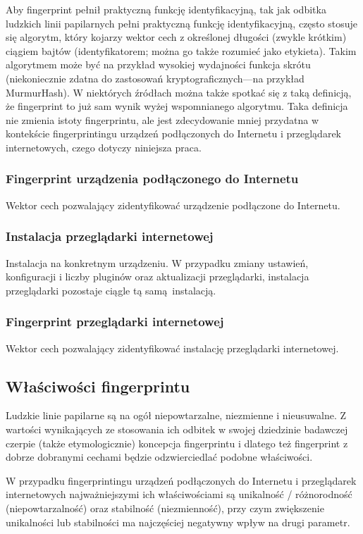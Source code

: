 Aby fingerprint pełnił praktyczną funkcję identyfikacyjną, tak jak odbitka
ludzkich linii papilarnych pełni praktyczną funkcję identyfikacyjną, często
stosuje się algorytm, który kojarzy wektor cech z określonej długości (zwykle
krótkim) ciągiem bajtów (identyfikatorem; można go także rozumieć jako
etykieta). Takim algorytmem może być na przykład wysokiej wydajności funkcja
skrótu (niekoniecznie zdatna do zastosowań kryptograficznych---na przykład
MurmurHash). W niektórych źródłach można także spotkać się z taką definicją, że
fingerprint to już sam wynik wyżej wspomnianego algorytmu. Taka definicja nie
zmienia istoty fingerprintu, ale jest zdecydowanie mniej przydatna w kontekście
fingerprintingu urządzeń podłączonych do Internetu i przeglądarek internetowych,
czego dotyczy niniejsza praca.

\subsubsection{Fingerprint urządzenia podłączonego do Internetu}
Wektor cech pozwalający zidentyfikować urządzenie podłączone do Internetu.

\subsubsection{Instalacja przeglądarki internetowej}
Instalacja na konkretnym urządzeniu. W przypadku zmiany ustawień, konfiguracji i
liczby pluginów oraz aktualizacji przeglądarki, instalacja przeglądarki
pozostaje ciągle tą samą instalacją.

\subsubsection{Fingerprint przeglądarki internetowej}
Wektor cech pozwalający zidentyfikować instalację przeglądarki internetowej.

\subsection{Właściwości fingerprintu}
Ludzkie linie papilarne są na ogół niepowtarzalne, niezmienne i nieusuwalne. Z
wartości wynikających ze stosowania ich odbitek w swojej dziedzinie badawczej
czerpie (także etymologicznie) koncepcja fingerprintu i dlatego też fingerprint
z dobrze dobranymi cechami będzie odzwierciedlać podobne właściwości.

W przypadku fingerprintingu urządzeń podłączonych do Internetu i przeglądarek
internetowych najważniejszymi ich właściwościami są unikalność / różnorodność
(niepowtarzalność) oraz stabilność (niezmienność), przy czym zwiększenie
unikalności lub stabilności ma najczęściej negatywny wpływ na drugi parametr.

